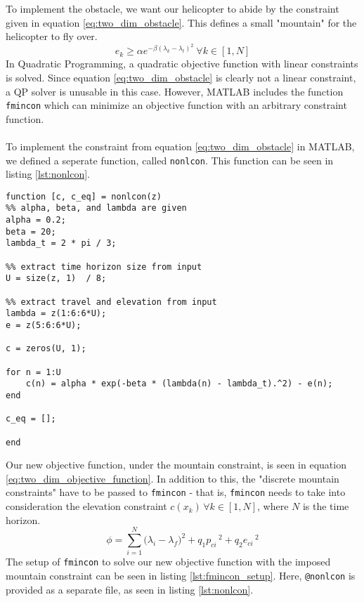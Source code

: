 To implement the obstacle, we want our helicopter to abide by the constraint given in equation \ref{eq:two_dim_obstacle}. This defines a small "mountain" for the helicopter to fly over.
\begin{equation}\label{eq:two_dim_obstacle}
    e_k \geq \alpha e^{-\beta (\lambda_k - \lambda_t)^2}\ \forall k\in [1,N]
\end{equation}
In Quadratic Programming, a quadratic objective function with linear constraints is solved. Since equation \ref{eq:two_dim_obstacle} is clearly not a linear constraint, a QP solver is unusable in this case. However, MATLAB includes the function \lstinline!fmincon! which can minimize an objective function with an arbitrary constraint function.\\
\\
To implement the constraint from equation \ref{eq:two_dim_obstacle} in MATLAB, we defined a seperate function, called \lstinline!nonlcon!. This function can be seen in listing \ref{lst:nonlcon}.
\begin{lstlisting}[caption=MATLAB implementation of non-linear "mountain" constraint.,label=lst:nonlcon]
function [c, c_eq] = nonlcon(z)
%% alpha, beta, and lambda are given
alpha = 0.2;
beta = 20;
lambda_t = 2 * pi / 3;

%% extract time horizon size from input
U = size(z, 1)  / 8;

%% extract travel and elevation from input
lambda = z(1:6:6*U);
e = z(5:6:6*U);

c = zeros(U, 1);

for n = 1:U
    c(n) = alpha * exp(-beta * (lambda(n) - lambda_t).^2) - e(n);
end

c_eq = [];

end
\end{lstlisting}
Our new objective function, under the mountain constraint, is seen in equation \ref{eq:two_dim_objective_function}. In addition to this, the "discrete mountain constraints" have to be passed to \lstinline!fmincon! - that is, \lstinline!fmincon! needs to take into consideration the elevation constraint $c(x_k)\,\forall k\in [1,N]$, where $N$ is the time horizon.
\begin{equation}\label{eq:two_dim_objective_function}
    \phi = \sum_{i = 1}^N \bigg(\lambda_i - \lambda_f\bigg)^2 + q_1p_{ci}\,^2+q_2e_{ci}\,^2
\end{equation}
The setup of \lstinline!fmincon! to solve our new objective function with the imposed mountain constraint can be seen in listing \ref{lst:fmincon_setup}. Here, \lstinline!@nonlcon! is provided as a separate file, as seen in listing \ref{lst:nonlcon}.
